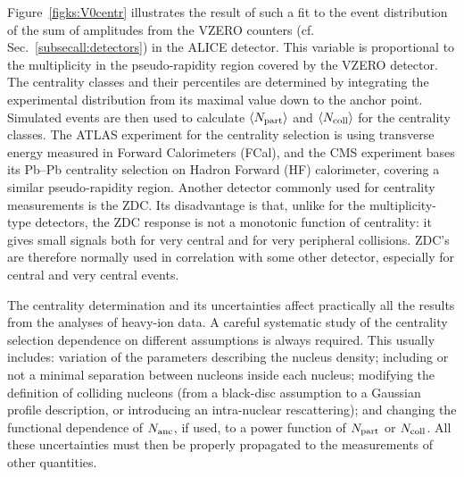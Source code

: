 Figure~\ref{figks:V0centr} illustrates the result of such a fit to the event distribution of the sum of amplitudes from the VZERO counters (cf. Sec.~\ref{subsecall:detectors}) in the ALICE detector. This variable is proportional to the multiplicity in the pseudo-rapidity region covered by the VZERO detector. The centrality classes and their percentiles are determined by integrating the experimental distribution from its maximal value down to the anchor point. Simulated events are then used to calculate $\langle N_{\rm part} \rangle$ and $\langle N_{\rm coll} \rangle$ for the centrality classes. The ATLAS experiment for the centrality selection is using transverse energy measured in Forward Calorimeters (FCal), and the CMS experiment bases its Pb--Pb centrality selection on Hadron Forward (HF) calorimeter, covering a similar pseudo-rapidity region. Another detector commonly used for centrality measurements is the ZDC. Its disadvantage is that, unlike for the multiplicity-type detectors, the ZDC response is not a monotonic function of centrality: it gives small signals both for very central and for very peripheral collisions.
ZDC's are therefore normally used in correlation with some other detector, especially for central and very central events.

The centrality determination and its uncertainties affect practically all the results from the analyses of heavy-ion data. A careful systematic study of the centrality selection dependence on different assumptions is always required. This usually includes: variation of the parameters describing the nucleus density; including or not a minimal separation between nucleons inside each nucleus; modifying the definition of colliding nucleons (from a black-disc assumption to a Gaussian profile description, or introducing an intra-nuclear rescattering); and changing the functional dependence of $N_{\rm anc}$, if used, to a power function of $N_{\rm part}$ or $N_{\rm coll}$. All these uncertainties must then be properly propagated to the measurements of other quantities.

